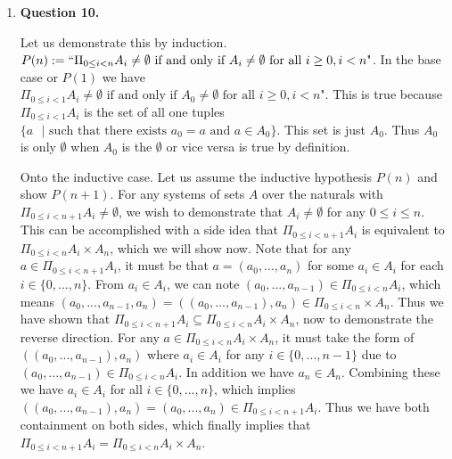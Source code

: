 \documentclass{article}
\begin{document}
\begin{enumerate}
				\medskip
				\item \textbf{Question 10.}
				\medskip
				
				Let us demonstrate this by induction. $P(n) := ``\Pi_{0 \leq i < n} A_i \neq \emptyset \text{ if and only if } A_i \neq \emptyset \text{ for all } i \geq 0, i < n \text{"}$. In the base case or $P(1)$ we have $\Pi_{0 \leq i < 1} A_i \neq \emptyset \text{ if and only if } A_0 \neq \emptyset \text{ for all } i \geq 0, i < n \text{"}$. This is true because $\Pi_{0 \leq i < 1} A_i$ is the set of all one tuples $\{a \text{ } | \text{ such that there exists } a_0 = a \text{ and } a \in A_0\}$. This set is just $A_0$. Thus $A_0$ is only $\emptyset$ when $A_0$ is the $\emptyset$ or vice versa is true by definition.
				
				\medskip
				Onto the inductive case. Let us assume the inductive hypothesis $P(n)$ and show $P(n + 1)$. For any systems of sets $A$ over the naturals with $\Pi_{0 \leq i < n + 1} A_i \neq \emptyset$, we wish to demonstrate that $A_i \neq \emptyset$ for any $0 \leq i \leq n$. This can be accomplished with a side idea that $\Pi_{0 \leq i < n + 1} A_i$ is equivalent to $\Pi_{0 \leq i < n} A_i \times A_n$, which we will show now. Note that for any $a \in \Pi_{0 \leq i < n + 1} A_i$, it must be that $a = (a_0, ..., a_n)$ for some $a_i \in A_i$ for each $i \in \{0, ..., n\}$. From $a_i \in A_i$, we can note $(a_0, ..., a_{n - 1}) \in \Pi_{0 \leq i < n} A_i$, which means $(a_0, ..., a_{n - 1}, a_{n}) = ((a_0, ..., a_{n - 1}), a_{n}) \in \Pi_{0 \leq i < n} \times A_n$. Thus we have shown that $\Pi_{0 \leq i < n + 1} A_i \subseteq \Pi_{0 \leq i < n}A_i \times A_n$, now to demonstrate the reverse direction. For any $a \in \Pi_{0 \leq i < n} A_i \times A_n$, it must take the form of $((a_0, ..., a_{n - 1}), a_n)$ where $a_i \in A_i$ for any $i \in \{0, ..., n - 1\}$ due to $(a_0, ..., a_{n - 1}) \in \Pi_{0 \leq i < n}A_i$. In addition we have $a_{n} \in A_n$. Combining these we have $a_i \in A_i$ for all $i \in \{0, ..., n\}$, which implies $((a_0, ..., a_{n - 1}), a_n) = (a_0, ..., a_n) \in \Pi_{0 \leq i < n + 1}A_i$. Thus we have both containment on both sides, which finally implies that $\Pi_{0 \leq i < n + 1} A_i = \Pi_{0 \leq i < n} A_i \times A_n$.
				

\end{enumerate}
\end{document}
